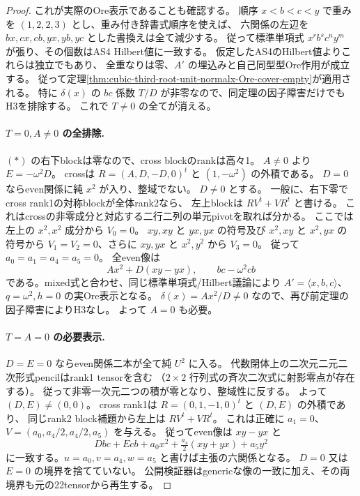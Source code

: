 \begin{proof}
これが実際のOre表示であることも確認する。
順序 $x<b<c<y$ で重みを $(1,2,2,3)$ とし、重み付き辞書式順序を使えば、
六関係の左辺を $bx,cx,cb,yx,yb,yc$ とした書換えは全て減少する。
従って標準単項式 $x^rb^sc^ny^m$ が張り、その個数はAS4 Hilbert値に一致する。
仮定したAS4のHilbert値よりこれらは独立でもあり、
全重なりは零、$A'$ の埋込みと自己同型型Ore作用が成立する。
従って定理\ref{thm:cubic-third-root-unit-normalx-Ore-cover-empty}が適用される。
特に $\delta(x)$ の $bc$ 係数 $T/D$ が非零なので、同定理の因子障害だけでもH3を排除する。
これで $T\ne0$ の全てが消える。

\paragraph{$T=0,A\ne0$ の全排除.}
$(*)$ の右下blockは零なので、cross blockのrankは高々1。
$A\ne0$ より $E=-\omega^2D$。
crossは $R=(A,D,-D,0)^t$ と $(1,-\omega^2)$ の外積である。
$D=0$ ならeven関係に純 $x^2$ が入り、整域でない。
$D\ne0$ とする。
一般に、右下零でcross rank1の対称blockが全体rank2なら、
左上blockは $RV^t+VR^t$ と書ける。
これはcrossの非零成分と対応する二行二列の単元pivotを取れば分かる。
ここでは左上の $x^2,x^2$ 成分から $V_0=0$。
$xy,xy$ と $yx,yx$ の符号及び $x^2,xy$ と $x^2,yx$ の符号から
$V_1=V_2=0$、さらに $xy,yx$ と $x^2,y^2$ から $V_3=0$。
従って $a_0=a_1=a_4=a_5=0$。
全even像は
\[
 A x^2+D(xy-yx),\qquad bc-\omega^2cb
\]
である。mixed式と合わせ、同じ標準単項式/Hilbert議論により
$A'=\langle x,b,c\rangle$、$q=\omega^2,h=0$ の実Ore表示となる。
$\delta(x)=A x^2/D\ne0$ なので、再び前定理の因子障害によりH3なし。
よって $A=0$ も必要。

\paragraph{$T=A=0$ の必要表示.}
$D=E=0$ ならeven関係二本が全て純 $U^2$ に入る。
代数閉体上の二次元二元二次形式pencilはrank1 tensorを含む
（$2\times2$ 行列式の斉次二次式に射影零点が存在する）。
従って非零一次元二つの積が零となり、整域性に反する。
よって $(D,E)\ne(0,0)$。
cross rank1は $R=(0,1,-1,0)^t$ と $(D,E)$ の外積であり、
同じrank2 block補題から左上は $RV^t+VR^t$。
これは正確に $a_1=0$、
$V=(a_0,a_4/2,a_4/2,a_5)$ を与える。
従ってeven像は $xy-yx$ と
\[
 Dbc+Ecb+a_0x^2+\tfrac{a_4}2(xy+yx)+a_5y^2
\]
に一致する。$u=a_0,v=a_4,w=a_5$ と書けば主張の六関係となる。
$D=0$ 又は $E=0$ の境界を捨てていない。
公開検証器はgenericな像の一致に加え、その両境界も元の22tensorから再生する。
\end{proof}
